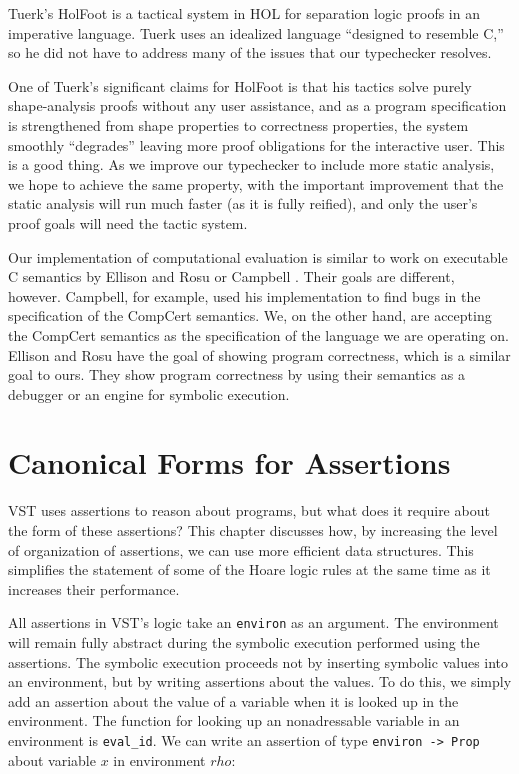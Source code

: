 \documentclass{puthesis}
\begin{document}
Tuerk's HolFoot \cite{Tuer09} is a tactical system in HOL for
separation logic proofs in an imperative language.  Tuerk uses an
idealized language ``designed to resemble C,'' so he did not have to
address many of the issues that our typechecker resolves.

One of Tuerk's significant claims for HolFoot is that his tactics
solve purely shape-analysis proofs without any user assistance, and as
a program specification is strengthened from shape properties to
correctness properties, the system smoothly ``degrades'' leaving more
proof obligations for the interactive user.  This is a good thing.  As
we improve our typechecker to include more static analysis, we hope to
achieve the same property, with the important improvement that the
static analysis will run much faster (as it is fully reified), and
only the user's proof goals will need the tactic system.

Our implementation of computational evaluation is similar to work on
executable C semantics by Ellison and Rosu \cite{ellison-rosu-2012-popl} or
Campbell \cite{Campbell-cpp-12}. Their goals are different, however.
Campbell, for example, used his implementation to find bugs in the
specification of the CompCert semantics. We, on the other hand, are accepting
the CompCert semantics as the specification of the language we are operating
on. Ellison and Rosu have the goal of showing program correctness, which is a 
similar goal to ours. They show program correctness by using their semantics as
a debugger or an engine for symbolic execution. 


\chapter{Canonical Forms for Assertions}
\label{ch:canonical}

VST uses assertions to reason about programs, but what does it require
about the form of these assertions? This chapter discusses how, by
increasing the level of organization of assertions, we can use more
efficient data structures. This simplifies the statement of some of
the Hoare logic rules at the same time as it increases their performance.

All assertions in VST's logic take an \lstinline|environ| as an
argument. The environment will remain fully abstract during the
symbolic execution performed using the assertions. The symbolic
execution proceeds not by inserting symbolic values into an
environment, but by writing assertions about the values. To do this,
we simply add an assertion about the value of a variable when it is
looked up in the environment. The function for looking up an
nonadressable variable in an environment is \lstinline|eval_id|. We can
write an assertion of type \lstinline|environ -> Prop| about variable
$x$ in environment $rho$:
\end{document}
